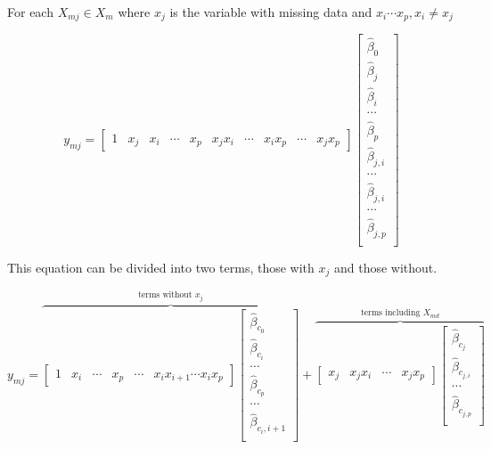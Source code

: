 \documentclass[../../paper.tex]{subfiles}
\begin{document}
For each $X_{mj} \in X_{m}$ where $x_{j}$ is the variable with missing data and $x_{i} \cdots x_{p}, x_{i} \neq x_{j}$



\begin{equation}
  y_{mj} =
  \begin{bmatrix}
    1 & x_{j} & x_{i} & \cdots & x_{p} & x_{j}x_{i} & \cdots & x_{i}x_{p} & \cdots & x_{j}x_{p}
  \end{bmatrix}
  \begin{bmatrix}
    \hat{\beta}_{0} \\
    \hat{\beta}_{j} \\
    \hat{\beta}_{i} \\
    \cdots \\
    \hat{\beta}_{p} \\
    \hat{\beta}_{j,i} \\
    \cdots \\
    \hat{\beta}_{j,i} \\
    \cdots \\
    \hat{\beta}_{j, p} \\

  \end{bmatrix}
\end{equation}

This equation can be divided into two terms, those with $x_{j}$ and those without.

\begin{equation}
  y_{mj} =
\overbrace{
  \begin{bmatrix}
    1 & x_{i} & \cdots & x_{p} &  \cdots & x_{i}x_{i+1} \cdots  x_{i}x_{p}
  \end{bmatrix}
  \begin{bmatrix}
    \hat{\beta}_{c_0} \\
    \hat{\beta}_{c_i} \\
    \cdots \\
    \hat{\beta}_{c_p} \\
    \cdots \\
    \hat{\beta}_{c_i,i+1} \\
  \end{bmatrix}}^{\text{terms without } x_{j}}
   +
  \overbrace{
  \begin{bmatrix}
    x_{j} & x_{j}x_{i} & \cdots & x_{j}x_{p}
  \end{bmatrix}
  \begin{bmatrix}
    \hat{\beta}_{c_{j}} \\
    \hat{\beta}_{c_{j,i}} \\
    \cdots \\
    \hat{\beta}_{c_{j,p}} \\
  \end{bmatrix}}^{\text{terms including } X_{md}}
\end{equation}
\end{document}

